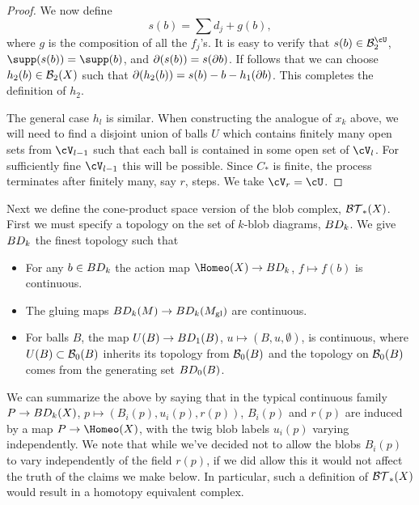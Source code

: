 \begin{proof}
We now define 
\[
	s(b) = \sum d_j + g(b),
\]
where $g$ is the composition of all the $f_j$'s.
It is easy to verify that $s(b) \in \sbc_2$, $\supp(s(b)) = \supp(b)$, and 
$\partial(s(b)) = s(\partial b)$.
If follows that we can choose $h_2(b)\in {\mathcal B}_2(X)$ such that $\partial(h_2(b)) = s(b) - b - h_1(\partial b)$.
This completes the definition of $h_2$.

The general case $h_l$ is similar.
When constructing the analogue of $x_k$ above, we will need to find a disjoint union of balls $U$
which contains finitely many open sets from $\cV_{l-1}$
such that each ball is contained in some open set of $\cV_l$.
For sufficiently fine $\cV_{l-1}$ this will be possible.
Since $C_*$ is finite, the process terminates after finitely many, say $r$, steps.
We take $\cV_r = \cU$.
\end{proof}


\medskip

Next we define the cone-product space version of the blob complex, ${\mathcal{BT}}_*(X)$.
First we must specify a topology on the set of $k$-blob diagrams, $BD_k$.
We give $BD_k$ the finest topology such that
\begin{itemize}
\item For any $b\in BD_k$ the action map $\Homeo(X) \to \BD_k$, $f \mapsto f(b)$ is continuous.
\item The gluing maps $BD_k(M)\to BD_k(M_\mathrm{gl})$ are continuous.
\item For balls $B$, the map $U(B) \to BD_1(B)$, $u\mapsto (B, u, \emptyset)$, is continuous,
where $U(B) \subset {\mathcal B}_0(B)$ inherits its topology from ${\mathcal B}_0(B)$ and the topology on
${\mathcal B}_0(B)$ comes from the generating set $BD_0(B)$. 
\end{itemize}

We can summarize the above by saying that in the typical continuous family
$P\to BD_k(X)$, $p\mapsto \left(B_i(p), u_i(p), r(p)\right)$, $B_i(p)$ and $r(p)$ are induced by a map
$P\to \Homeo(X)$, with the twig blob labels $u_i(p)$ varying independently. 
We note that while we've decided not to allow the blobs $B_i(p)$ to vary independently of the field $r(p)$,
if we did allow this it would not affect the truth of the claims we make below.
In particular, such a definition of ${\mathcal{BT}}_*(X)$ would result in a homotopy equivalent complex.

